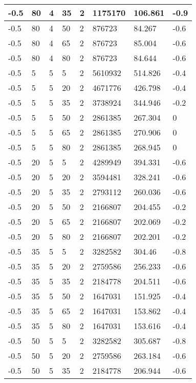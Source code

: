 \begin{longtable}{|p{1.4cm}|p{1.4cm}|p{1.4cm}|p{1.4cm}|p{1.4cm}|p{1.4cm}|p{1.4cm}|p{1.5cm}|}
        -0.5 & 80 & 4 & 35 & 2 & 1175170 & 106.861 & -0.9 \\ \hline
        -0.5 & 80 & 4 & 50 & 2 & 876723 & 84.267 & -0.6 \\ \hline
        -0.5 & 80 & 4 & 65 & 2 & 876723 & 85.004 & -0.6 \\ \hline
        -0.5 & 80 & 4 & 80 & 2 & 876723 & 84.644 & -0.6 \\ \hline
        -0.5 & 5 & 5 & 5 & 2 & 5610932 & 514.826 & -0.4 \\ \hline
        -0.5 & 5 & 5 & 20 & 2 & 4671776 & 426.798 & -0.4 \\ \hline
        -0.5 & 5 & 5 & 35 & 2 & 3738924 & 344.946 & -0.2 \\ \hline
        -0.5 & 5 & 5 & 50 & 2 & 2861385 & 267.304 & 0 \\ \hline
        -0.5 & 5 & 5 & 65 & 2 & 2861385 & 270.906 & 0 \\ \hline
        -0.5 & 5 & 5 & 80 & 2 & 2861385 & 268.945 & 0 \\ \hline
        -0.5 & 20 & 5 & 5 & 2 & 4289949 & 394.331 & -0.6 \\ \hline
        -0.5 & 20 & 5 & 20 & 2 & 3594481 & 328.241 & -0.6 \\ \hline
        -0.5 & 20 & 5 & 35 & 2 & 2793112 & 260.036 & -0.6 \\ \hline
        -0.5 & 20 & 5 & 50 & 2 & 2166807 & 204.455 & -0.2 \\ \hline
        -0.5 & 20 & 5 & 65 & 2 & 2166807 & 202.069 & -0.2 \\ \hline
        -0.5 & 20 & 5 & 80 & 2 & 2166807 & 202.201 & -0.2 \\ \hline
        -0.5 & 35 & 5 & 5 & 2 & 3282582 & 304.46 & -0.8 \\ \hline
        -0.5 & 35 & 5 & 20 & 2 & 2759586 & 256.233 & -0.6 \\ \hline
        -0.5 & 35 & 5 & 35 & 2 & 2184778 & 204.511 & -0.6 \\ \hline
        -0.5 & 35 & 5 & 50 & 2 & 1647031 & 151.925 & -0.4 \\ \hline
        -0.5 & 35 & 5 & 65 & 2 & 1647031 & 153.862 & -0.4 \\ \hline
        -0.5 & 35 & 5 & 80 & 2 & 1647031 & 153.616 & -0.4 \\ \hline
        -0.5 & 50 & 5 & 5 & 2 & 3282582 & 305.687 & -0.8 \\ \hline
        -0.5 & 50 & 5 & 20 & 2 & 2759586 & 263.184 & -0.6 \\ \hline
        -0.5 & 50 & 5 & 35 & 2 & 2184778 & 206.944 & -0.6 \\ \hline

\end{longtable}
